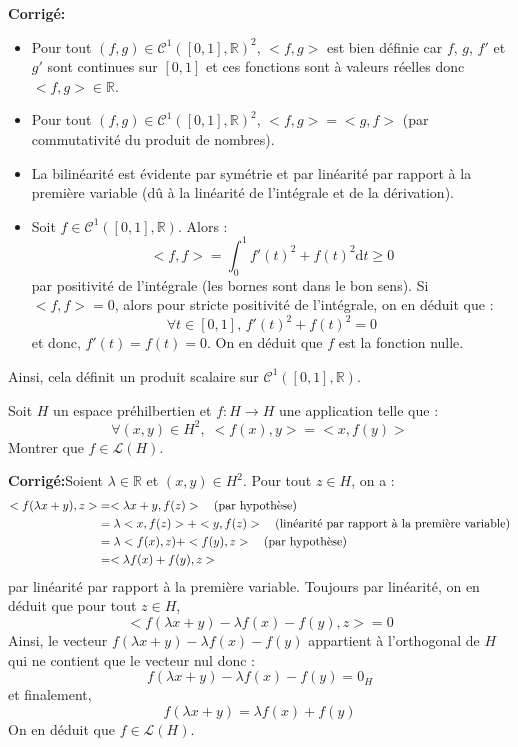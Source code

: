 \documentclass[a4paper,twoside,french,11pt]{VcCours}
\newcommand{\dt}{\text{d}t}
\newcommand{\corr}{\textbf{Corrigé:}}
\begin{document}
\corr 

\begin{itemize}
\item Pour tout $(f,g) \in \mathcal{C}^1([0,1],\mathbb{R})^2$, $<f,g>$ est bien définie car $f$, $g$, $f'$ et $g'$ sont continues sur $[0,1]$ et ces fonctions sont à valeurs réelles donc $<f,g> \in \mathbb{R}$.
\item Pour tout $(f,g) \in \mathcal{C}^1([0,1],\mathbb{R})^2$, $<f,g>= <g,f>$ (par commutativité du produit de nombres).
\item La bilinéarité est évidente par symétrie et par linéarité par rapport à la première variable (dû à la linéarité de l'intégrale et de la dérivation).
\item Soit $f \in \mathcal{C}^1([0,1],\mathbb{R})$. Alors :
$$ <f,f> =\int_0^1 f'(t)^2+f(t)^2 \dt \geq 0$$
par positivité de l'intégrale (les bornes sont dans le bon sens). Si $<f,f>=0$, alors pour stricte positivité de l'intégrale, on en déduit que :
$$ \forall t \in [0,1], \, f'(t)^2+f(t)^2=0$$
et donc, $f'(t)=f(t)=0$. On en déduit que $f$ est la fonction nulle. 
\end{itemize}
Ainsi, cela définit un produit scalaire sur $\mathcal{C}^1([0,1],\mathbb{R})$.

\begin{Exercice}{} Soit $H$ un espace préhilbertien et $f : H \rightarrow H$ une application telle que :
$$ \forall (x,y) \in H^2, \; <f(x),y>=<x,f(y)>$$
Montrer que $f \in \mathcal{L}(H)$.
\end{Exercice} 

\corr Soient $\lambda \in \mathbb{R}$ et $(x,y) \in H^2$. Pour tout $z \in H$, on a :
\begin{align*}
<f(\lambda x +y),z> & = <\lambda x+y, f(z)> \quad \hbox{(par hypothèse)} \\
& = \lambda <x,f(z)> + <y,f(z)> \quad \hbox{(linéarité par rapport à la première variable)} \\
& = \lambda <f(x),z) + <f(y),z>  \quad \hbox{(par hypothèse)} \\
& = <\lambda f(x)+f(y), z> 
\end{align*}
par linéarité par rapport à la première variable. Toujours par linéarité, on en déduit que pour tout $z \in H$,
$$ <f(\lambda x +y)-\lambda f(x)-f(y), z> =0$$
Ainsi, le vecteur $f(\lambda x +y)-\lambda f(x)-f(y)$ appartient à l'orthogonal de $H$ qui ne contient que le vecteur nul donc :
$$ f(\lambda x +y)-\lambda f(x)-f(y) = 0_H$$
et finalement,
$$ f(\lambda x +y)= \lambda f(x)+f(y)$$
On en déduit que $f \in \mathcal{L}(H)$.
\end{document}
